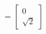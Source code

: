 \documentclass[preview]{standalone}
\begin{document}
\begin{align*}
=\begin{bmatrix}0\\\sqrt{2}\end{bmatrix}
\end{align*}
\end{document}
